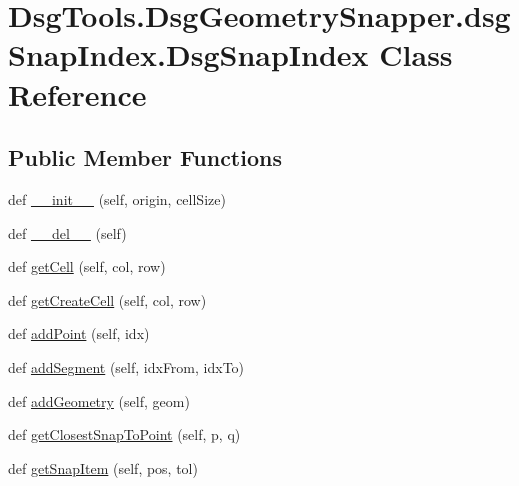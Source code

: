 \hypertarget{class_dsg_tools_1_1_dsg_geometry_snapper_1_1dsg_snap_index_1_1_dsg_snap_index}{}\section{Dsg\+Tools.\+Dsg\+Geometry\+Snapper.\+dsg\+Snap\+Index.\+Dsg\+Snap\+Index Class Reference}
\label{class_dsg_tools_1_1_dsg_geometry_snapper_1_1dsg_snap_index_1_1_dsg_snap_index}
\subsection*{Public Member Functions}
\begin{DoxyCompactItemize}
\item 
def \mbox{\hyperlink{class_dsg_tools_1_1_dsg_geometry_snapper_1_1dsg_snap_index_1_1_dsg_snap_index_a68ccda1bae397cedca0faa8370492898}{\+\_\+\+\_\+init\+\_\+\+\_\+}} (self, origin, cell\+Size)
\item 
def \mbox{\hyperlink{class_dsg_tools_1_1_dsg_geometry_snapper_1_1dsg_snap_index_1_1_dsg_snap_index_aadef73cc22c14216d075072627d21159}{\+\_\+\+\_\+del\+\_\+\+\_\+}} (self)
\item 
def \mbox{\hyperlink{class_dsg_tools_1_1_dsg_geometry_snapper_1_1dsg_snap_index_1_1_dsg_snap_index_ad42dd41c1bdfc6bdfd6a0965601f9752}{get\+Cell}} (self, col, row)
\item 
def \mbox{\hyperlink{class_dsg_tools_1_1_dsg_geometry_snapper_1_1dsg_snap_index_1_1_dsg_snap_index_a3ffaa95a4802e8d2185c0cc72cab0527}{get\+Create\+Cell}} (self, col, row)
\item 
def \mbox{\hyperlink{class_dsg_tools_1_1_dsg_geometry_snapper_1_1dsg_snap_index_1_1_dsg_snap_index_a4cf0f03c762bf6ee7bf07c78dfdbb55b}{add\+Point}} (self, idx)
\item 
def \mbox{\hyperlink{class_dsg_tools_1_1_dsg_geometry_snapper_1_1dsg_snap_index_1_1_dsg_snap_index_a0700c214adf8731c2bc5e473e46fd4b9}{add\+Segment}} (self, idx\+From, idx\+To)
\item 
def \mbox{\hyperlink{class_dsg_tools_1_1_dsg_geometry_snapper_1_1dsg_snap_index_1_1_dsg_snap_index_a25cfcfe6108574caf1a8eb503ffedff5}{add\+Geometry}} (self, geom)
\item 
def \mbox{\hyperlink{class_dsg_tools_1_1_dsg_geometry_snapper_1_1dsg_snap_index_1_1_dsg_snap_index_a98c7217540299dec84c5613c06143167}{get\+Closest\+Snap\+To\+Point}} (self, p, q)
\item 
def \mbox{\hyperlink{class_dsg_tools_1_1_dsg_geometry_snapper_1_1dsg_snap_index_1_1_dsg_snap_index_aaf9c1b8145c136b2d5d28990edfa0d16}{get\+Snap\+Item}} (self, pos, tol)
\end{DoxyCompactItemize}
